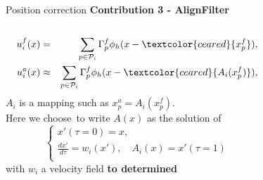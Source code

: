 \documentclass[aspectratio=169]{beamer} %
\begin{document}
\begin{frame}{Position correction}
    \textbf{Contribution 3 - AlignFilter} \\
    \begin{columns}[t]
        \begin{column}{0.6\textwidth}
            \vspace{-0.7cm}

            \begin{eqnarray*}
                u_i^f(x) &=& \sum_{p \in \mathcal P_i} \Gamma^f_p \phi_h(x - \textcolor{ceared}{x_p^f}), \\
                u_i^a(x) &\approx& \sum_{p \in \mathcal P_i} \Gamma^f_p \phi_h(x - \textcolor{ceared}{A_i(x_p^f)}), \\
            \end{eqnarray*}
            $A_i$ is a mapping such as $x^a_{p} = A_i(x^f_{p})$. \\
            Here we choose~\footnotemark[1] to write $A(x)$ as the solution of\\
            \begin{equation*}
                \begin{cases}
                    x'(\tau = 0) = x,                                           \\
                    \frac{d x'}{d \tau} = w_i (x'), \quad A_i(x) = x'(\tau = 1) \\
                \end{cases}
            \end{equation*}with $w_i$ a velocity field \textbf{to determined}
        \end{column}
        \begin{column}{0.4\textwidth}
            \begin{figure}
                \centering

\end{figure}
\end{column}
\end{columns}
\end{frame}
\end{document}
